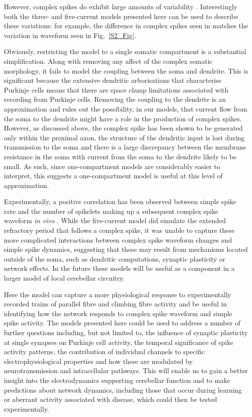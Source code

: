 \documentclass[twocolumn]{svjour3}          %
\begin{document}
However, complex spikes do exhibit large amounts of variability
\citep{BurroughsEtAl2016,WarnaarEtAl2015}. Interestingly both the
three- and five-current models presented here can be
used to describe these variations: for example, the difference in
complex spikes seen in \citet{MonsivaisEtAl2005} matches the variation
in waveform seen in Fig.~\ref{S2_Fig}.

Obviously, restricting the model to a single somatic compartment is a
substantial simplification. Along with removing any affect of the
complex somatic morphology, it fails to model the coupling between the
soma and dendrite. This is significant because the extensive dendritic
arborisations that characterise Purkinje cells means that there are
space clamp limitations associated with recording from Purkinje
cells. Removing the coupling to the dendrite is an approximation and
rules out the possibility, in our models, that current flow from the
soma to the dendrite might have a role in the production of complex
spikes. However, as discussed above, the complex spike has been shown
to be generated only within the proximal axon, the structure of the
dendritic input is lost during transmission to the soma and there is a
large discrepancy between the membrane resistance in the soma with
current from the soma to the dendrite likely to be small. As such,
since one-compartment models are considerably easier to interpret,
this suggests a one-compartment model is useful at this level of
approximation.

Experimentally, a positive correlation has been observed between
simple spike rate and the number of spikelets making up a subsequent
complex spike waveform \textit{in vivo}
\citep{BurroughsEtAl2016}. While the five-current model did simulate
the extended refractory period that follows a complex spike, it was
unable to capture these more complicated interactions between complex
spike waveform changes and simple spike dynamics, suggesting that
these may result from mechanisms located outside of the soma, such as
dendritic computations, synaptic plasticity or network effects. In the
future these models will be useful as a component in a larger model of
local cerebellar circuitry.

Here the model can capture a more physiological response to
experimentally recorded trains of parallel fibre and climbing fibre
activity and be useful in identifying how the network responds to
complex spike waveform and simple spike activity. The models presented
here could be used to address a number of further questions including,
but not limited to, the influence of synaptic plasticity at single
synapses on Purkinje cell activity, the temporal significance of spike
activity patterns, the contribution of individual channels to specific
electrophysiological properties and how these are modulated by
neurotransmission and intracellular pathways. This will enable us to
gain a better insight into the electrodynamics supporting cerebellar
function and to make predictions about network dynamics, including
those that occur during learning or aberrant activity associated with
disease, which could then be tested experimentally.
\end{document}
